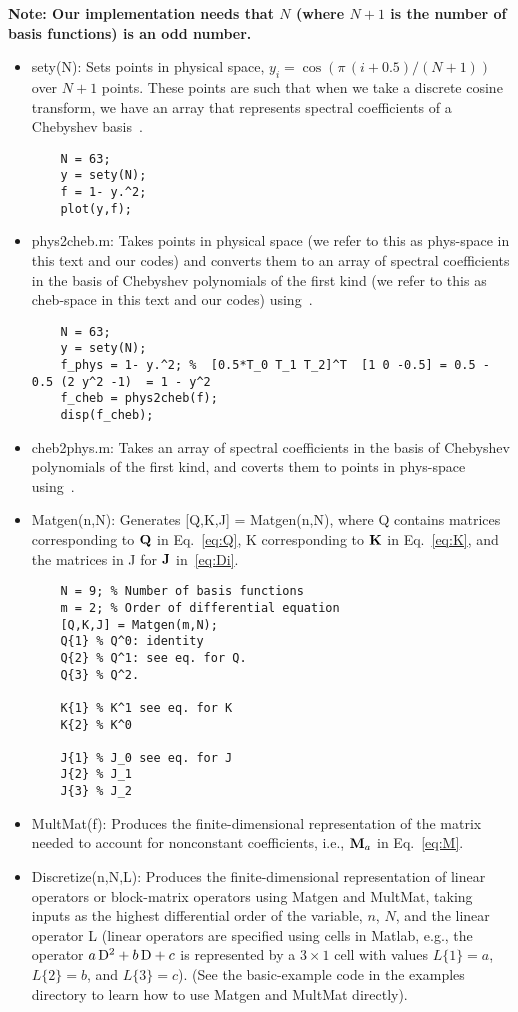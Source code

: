 \documentclass[%
secnumarabic,%
 amssymb, amsmath,%
 aps,prf,superscriptaddress,longbibliography
frontmatterverbose,
]{revtex4-2}
\begin{document}
\textbf{Note: Our implementation needs that $N$ (where $N+1$ is the number of basis functions) is an odd number.}
\begin{itemize}
  \item \textsf{sety(N)}: Sets points in physical space, $y_i = \cos (\pi \,(i + 0.5) / (N + 1))$ over $N + 1$ points. These points are such that when we take a discrete cosine transform, we have an array that represents spectral coefficients of a Chebyshev basis~\cite[Eq. 12.4.16-17]{NumRecipes}.
  \begin{lstlisting}
    N = 63;
    y = sety(N);
    f = 1- y.^2;
    plot(y,f);
  \end{lstlisting}
  \item \textsf{phys2cheb.m}: Takes points in physical space (we refer to this as phys-space in this text and our codes) and converts them to an array of spectral coefficients in the basis of Chebyshev polynomials of the first kind (we refer to this as cheb-space in this text and our codes) using~\cite[Eq. 12.4.16-17]{NumRecipes}.
  \begin{lstlisting}
    N = 63;
    y = sety(N);
    f_phys = 1- y.^2; %  [0.5*T_0 T_1 T_2]^T  [1 0 -0.5] = 0.5 - 0.5 (2 y^2 -1)  = 1 - y^2
    f_cheb = phys2cheb(f);
    disp(f_cheb);
  \end{lstlisting}
  \item \textsf{cheb2phys.m}: Takes an array of spectral coefficients in the basis of Chebyshev polynomials of the first kind, and coverts them to points in phys-space using~\cite[Eq. 12.4.16-17]{NumRecipes}.
  \item \textsf{Matgen(n,N)}: Generates \textsf{[Q,K,J] = Matgen(n,N)}, where \textsf{Q} contains matrices corresponding to $\mathbf{Q}$ in Eq.~\eqref{eq:Q}, \textsf{K} corresponding to $\mathbf{K}$ in Eq.~\eqref{eq:K}, and the matrices in \textsf{J} for $\mathbf{J}$ in~\eqref{eq:Di}.
  \begin{lstlisting}
    N = 9; % Number of basis functions
    m = 2; % Order of differential equation
    [Q,K,J] = Matgen(m,N);
    Q{1} % Q^0: identity
    Q{2} % Q^1: see eq. for Q.
    Q{3} % Q^2.
    
    K{1} % K^1 see eq. for K
    K{2} % K^0
    
    J{1} % J_0 see eq. for J
    J{2} % J_1
    J{3} % J_2
  \end{lstlisting}
  \item \textsf{MultMat(f)}: Produces the finite-dimensional representation of the matrix needed to account for nonconstant coefficients, i.e., $\mathbf{M}_a$ in Eq.~\eqref{eq:M}.
  \item \textsf{Discretize(n,N,L)}: Produces the finite-dimensional representation of linear operators or block-matrix operators using \textsf{Matgen} and \textsf{MultMat}, taking inputs as the highest differential order of the variable, $n$, $N$, and the linear operator L (linear operators are specified using cells in Matlab, e.g., the operator $a\,\mathrm D^2 + b\,\mathrm D + c$ is represented by a $3\times 1$ cell with values $L\{1\} = a$, $L\{2\} = b$, and $L\{3\} = c$). (See the basic-example code in the examples directory to learn how to use \textsf{Matgen} and \textsf{MultMat} directly).
 

\end{itemize}
\end{document}
